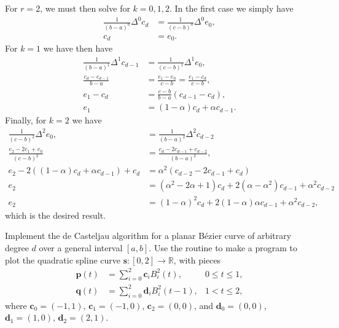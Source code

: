 \begin{solution}
    For $r = 2$, we must then solve for $k = 0, 1, 2$.
    In the first case we simply have
    \begin{align*}
        \frac{1}{(b - a)^0} \Delta^0 c_d &= \frac{1}{(c - b)^0} \Delta^0 e_0, \\
        c_d &= e_0.
    \end{align*}
    For $k = 1$ we have then have
    \begin{align*}
        \frac{1}{(b - a)^1} \Delta^1 c_{d - 1} &= \frac{1}{(c - b)^1} \Delta^1 e_0, \\
        \frac{c_d - c_{d-1}}{b - a} &= \frac{e_1 - e_0}{c - b} = \frac{e_1 - c_d}{c - b}, \\
        e_1 - c_d &= \frac{c - b}{b - a} (c_{d-1} - c_d), \\
        e_1 &= (1 - \alpha) c_d + \alpha c_{d-1}.
    \end{align*}
    Finally, for $k = 2$ we have
    \begin{align*}
        \frac{1}{(c - b)^2} \Delta^2 e_0, &= \frac{1}{(b - a)^2} \Delta^2 c_{d - 2} \\
        \frac{e_2 - 2 e_1 + e_0}{(c-b)^2} &= \frac{c_{d} - 2 c_{d-1} + c_{d-2}}{(b-a)^2}, \\
        e_2 - 2 \left( (1 - \alpha) c_d + \alpha c_{d-1} \right) + c_d &= \alpha^2 \left( c_{d-2} - 2 c_{d-1} + c_d \right) \\
        e_2 &= \left( \alpha^2 - 2 \alpha + 1 \right) c_d + 2 \left( \alpha - \alpha^2 \right) c_{d-1} + \alpha^2 c_{d-2} \\
        e_2 &= (1 - \alpha)^2 c_d + 2(1 - \alpha) \alpha c_{d-1} + \alpha^2 c_{d-2},
    \end{align*}
    which is the desired result.
\end{solution}

\begin{exercise}\label{ex:bezier_spline}
    Implement the de Casteljau algorithm for a planar Bézier curve of arbitrary degree $d$ over a general interval $[a, b]$.
    Use the routine to make a program to plot the quadratic spline curve $\mathbf{s} : [0, 2] \to \mathbb{R}$, with pieces
    \begin{align*}
        \mathbf{p}(t) &= \sum_{i=0}^{2} \mathbf{c}_i B_{i}^2(t), & 0 \leq t \leq 1, \\
        \mathbf{q}(t) &= \sum_{i=0}^{2} \mathbf{d}_i B_{i}^2(t - 1), & 1 < t \leq 2,
    \end{align*}
    where $\mathbf{c}_0 = (-1, 1)$, $\mathbf{c}_1 = (-1, 0)$, $\mathbf{c}_2 = (0, 0)$, and $\mathbf{d}_0 = (0, 0)$, $\mathbf{d}_1 = (1, 0)$, $\mathbf{d}_2 = (2, 1)$.
\end{exercise}

